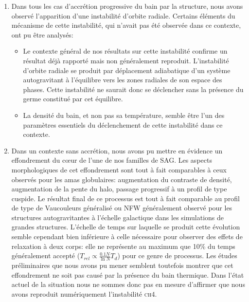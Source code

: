 \begin{enumerate}

	\item Dans tous les cas d'accrétion progressive du bain par la structure,
	nous avons observé l'apparition d'une instabilité d'orbite radiale.
	Certains éléments du mécanisme de cette instabilité,
	qui n'avait pas été observée dans ce contexte, ont pu être
	analysés:

	\begin{itemize}
		\item Le contexte général de nos résultats sur cette
		instabilité confirme un résultat déjà rapporté mais non
		généralement reproduit. L'instabilité d'orbite radiale se produit
		par déplacement adiabatique d'un système autogravitant à
		l'équilibre vers les zones radiales de son espace des phases. Cette
		instabilité ne saurait donc se déclencher sans la présence du
		germe constitué par cet équilibre.

		\item La densité du bain, et non pas sa température, semble être
		l'un des paramètres essentiels du déclenchement de cette
		instabilité dans ce contexte. 
	\end{itemize}

	\item Dans un contexte sans accrétion, nous avons pu mettre en
	évidence un effondrement du cœur de l'une de nos familles de SAG. Les
	aspects morphologiques de cet effondrement sont tout à fait comparables
	à ceux observés pour les amas globulaires: augmentation du contraste
	de densité, augmentation de la pente du halo, passage progressif à un
	profil de type cuspide. Le résultat final de ce processus est tout à
	fait comparable au profil de type de Vaucouleurs généralisé ou NFW
	généralement observé pour les structures autogravitantes à
	l'échelle galactique dans les simulations de grandes structures.
	L'échelle de temps sur laquelle se produit cette évolution semble
	cependant bien inférieure à celle nécessaire pour observer des
	effets de relaxation à deux corps: elle ne représente au maximum que
	10\% du temps généralement accepté ($T_{rel}\propto\frac{0.1N}{\ln
	N}T_{d}$) pour ce genre de processus. Les études préliminaires que
	nous avons pu mener semblent toutefois montrer que cet effondrement ne soit
	pas causé par la présence du bain thermique. Dans l'état actuel de
	la situation nous ne sommes donc pas en mesure d'affirmer que nous avons
	reproduit numériquement l'instabilité \textsc{ch4}.
\end{enumerate}



